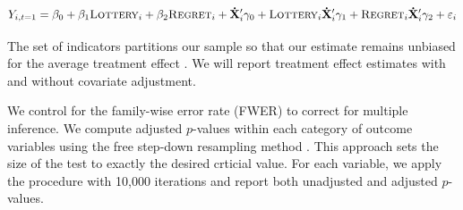 \documentclass[11pt]{article}
\begin{document}
		\begin{equation} \label{eq:controls}
			Y_{i,t=1} = \beta_{0} + \beta_{1}\text{\textsc{Lottery}}_{i} + \beta_{2}\text{\textsc{Regret}}_{i} + \mathbf{\dot X}'_i \gamma_{0} + \text{\textsc{Lottery}}_{i} \mathbf{\dot X}'_i \gamma_{1} + \text{\textsc{Regret}}_{i} \mathbf{\dot X}'_i \gamma_{2} + \varepsilon_{i}
		\end{equation}


		The set of indicators partitions our sample so that our estimate remains unbiased for the average treatment effect . We will report treatment effect estimates with and without covariate adjustment.


		We control for the family-wise error rate (FWER) to correct for multiple inference. We compute adjusted $p$-values within each category of outcome variables using the free step-down resampling method . This approach sets the size of the test to exactly the desired crticial value. For each variable, we apply the procedure with 10,000 iterations and report both unadjusted and adjusted $p$-values.
\end{document}
